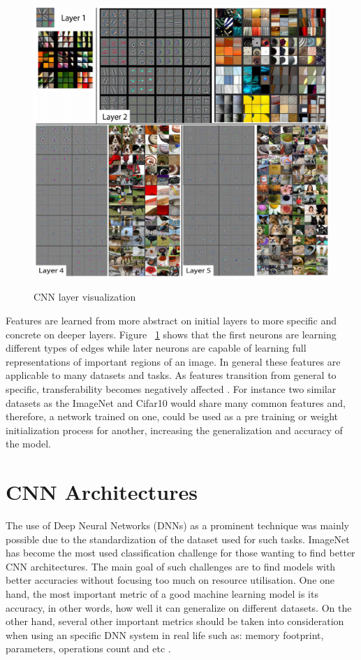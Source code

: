 \begin{figure}[!h]
	\centering
	\includegraphics[scale=0.6]{layer_vis.png}
	\caption{CNN layer visualization}
	\cite{zeiler2014visualizing}
	\label{fig:conv_layer_vis}
\end{figure}

Features are learned from more abstract on initial layers to more specific and concrete on deeper layers. Figure ~\ref{fig:conv_layer_vis} shows that the first neurons are learning different types of edges while later neurons are capable of learning full representations of important regions of an image. In general these features are applicable to many datasets and tasks. As features transition from general to specific, transferability becomes negatively affected \cite{yosinski2014transferable}. For instance two similar datasets as the ImageNet and Cifar10 would share many common features and, therefore, a network trained on one, could be used as a pre training or weight initialization process for another, increasing the generalization and accuracy of the model.
\section{CNN Architectures}

The use of Deep Neural Networks (DNNs) as a prominent technique was mainly possible due to the standardization of the dataset used for such tasks. ImageNet has become the most used classification challenge for those wanting to find better CNN architectures. The main goal of such challenges are to find models with better accuracies without focusing too much on resource utilisation. One one hand, the most important metric of a good machine learning model is its accuracy, in other words, how well it can generalize on different datasets. On the other hand, several other important metrics should be taken into consideration when using an specific DNN system in real life such as: memory footprint, parameters, operations count and etc \cite{canziani2016analysis}.

